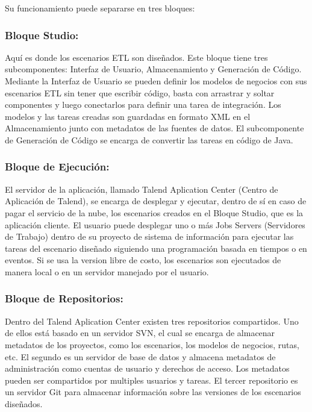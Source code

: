 Su funcionamiento puede separarse en 
tres bloques: 

\subsubsection{Bloque Studio:}

Aquí es donde los escenarios ETL son diseñados. Este bloque tiene tres subcomponentes: Interfaz de Usuario, Almacenamiento
y Generación de Código. Mediante la Interfaz de Usuario se pueden definir los modelos de negocios con sus escenarios ETL 
sin tener que escribir código, basta con arrastrar y soltar componentes y luego conectarlos para definir una tarea de 
integración. Los modelos y las tareas creadas son guardadas en formato XML en el Almacenamiento junto con metadatos 
de las fuentes de datos. El subcomponente de Generaci\'on de C\'odigo se encarga de convertir las tareas en c\'odigo de 
Java. 

\subsubsection{Bloque de Ejecución:}

El servidor de la aplicación, llamado Talend Aplication 
Center (Centro de Aplicaci\'on de Talend), se encarga de desplegar y ejecutar, dentro de s\'i en caso de pagar el 
servicio de la nube, los escenarios creados 
en el Bloque Studio, que es la aplicación cliente. El usuario puede desplegar uno o m\'as Jobs Servers 
(Servidores de Trabajo) dentro de su proyecto de sistema de información para ejecutar las tareas del escenario diseñado 
siguiendo una programación basada en tiempos o en eventos. Si se usa la version libre de costo, los escenarios son 
ejecutados de manera local o en un servidor manejado por el usuario.

\subsubsection{Bloque de Repositorios:}

Dentro del Talend Aplication Center existen tres repositorios compartidos. Uno de ellos est\'a basado en un servidor SVN, 
el cual se encarga de almacenar metadatos de los proyectos, como los escenarios, los modelos de negocios, rutas, etc. 
El segundo es un servidor de base de datos y almacena metadatos de administraci\'on como cuentas de usuario y derechos de 
acceso. Los metadatos pueden ser compartidos por multiples usuarios y tareas. El tercer repositorio es un servidor 
Git para almacenar informaci\'on sobre las versiones de los escenarios diseñados.





